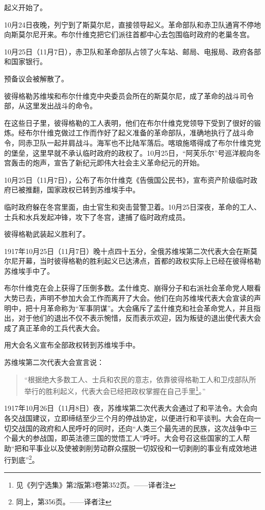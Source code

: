 起义开始了。

10月24日夜晚，列宁到了斯莫尔尼，直接领导起义。革命部队和赤卫队通宵不停地向斯莫尔尼开来。布尔什维克把它们派往首都中心去包围临时政府的老巢冬宫。

10月25日（11月7日），赤卫队和革命部队占领了火车站、邮局、电报局、政府各部和国家银行。

预备议会被解散了。

彼得格勒苏维埃和布尔什维克中央委员会所在的斯莫尔尼，成了革命的战斗司令部，从这里发出战斗的命令。

在这些日子里，彼得格勒的工人表明，他们在布尔什维克党领导下受到了很好的锻炼。经布尔什维克做过工作而作好了起义准备的革命部队，准确地执行了战斗命令，同赤卫队一起并肩战斗。海军也不比陆军落后。喀琅施塔得成了布尔什维克党的堡垒，这里早就不承认临时政府的政权了。10月25日，“阿芙乐尔”号巡洋舰向冬宫轰击的炮声，宣告了新纪元即伟大社会主义革命纪元的开始。

10月25日（11月7日），公布了布尔什维克《告俄国公民书》，宣布资产阶级临时政府已被推翻，国家政权已转到苏维埃手中。

临时政府躲在冬宫里面，由士官生和突击营警卫着。10月25日深夜，革命的工人、士兵和水兵发起冲锋，攻下了冬宫，逮捕了临时政府成员。

彼得格勒武装起义胜利了。

1917年10月25日（11月7日）晚十点四十五分，全俄苏维埃第二次代表大会在斯莫尔尼开幕，当时彼得格勒的胜利起义已达沸点，首都的政权实际上已经在彼得格勒苏维埃手中了。

布尔什维克在会上获得了压倒多数。孟什维克、崩得分子和右派社会革命党人眼看大势已去，声明不参加大会工作而离开了大会。他们在向苏维埃代表大会宣读的声明中，把十月革命称为“军事阴谋”。大会痛斥了孟什维克和社会革命党人，并且指出，对于他们的退出不仅不表示惋惜，反而表示欢迎，因为叛徒的退出使代表大会成了真正革命的工兵代表大会。

用大会名义宣布全部政权转到苏维埃手中。

苏维埃第二次代表大会宣言说：

\begin{quotation}
“根据绝大多数工人、士兵和农民的意志，依靠彼得格勒工人和卫戍部队所举行的胜利起义，代表大会已经把政权掌握在自己手里\footnote{见《列宁选集》第2版第3卷第352页。——译者注}。”
\end{quotation}

1917年10月26日（11月8日）夜，苏维埃第二次代表大会通过了和平法令。大会向各交战国建议，立即缔结至少三个月的停战协定，以便进行和平谈判。大会在向一切交战国的政府和人民呼吁的同时，还向“人类三个最先进的民族，这次战争中三个最大的参战国，即英法德三国的觉悟工人”呼吁。大会号召这些国家的工人帮助“把和平事业以及使被剥削劳动群众摆脱一切奴役和一切剥削的事业有成效地进行到底”\footnote{同上，第356页。——译者注}。

